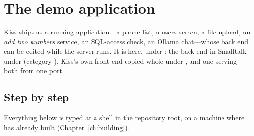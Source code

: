 \section{The demo application}
\label{sec:demo}

Kiss ships as a running application---a phone list, a users screen, a file
upload, an \emph{add two numbers} service, an SQL-access check, an
Ollama chat---whose back end can be edited while the server runs. It is
here, under : the back end in Smalltalk under 
(category ), Kiss's own front end copied whole under
, and one  serving both from one port.

\subsection{Step by step}

Everything below is typed at a shell in the repository root, on a machine
where  has already built  (Chapter~\ref{ch:building}).

